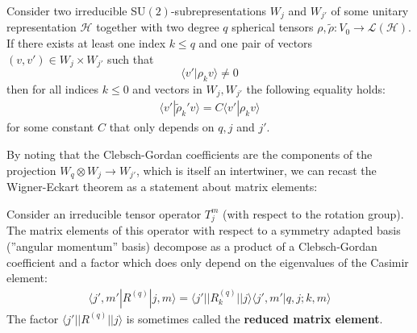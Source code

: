 	\begin{theorem}
		Consider two irreducible SU$(2)$-subrepresentations $W_j$ and $W_{j'}$ of some unitary representation $\mathcal{H}$ together with two degree $q$ spherical tensors $\rho, \tilde{\rho}:V_0\rightarrow\mathcal{L}(\mathcal{H})$. If there exists at least one index $k\leq q$ and one pair of vectors $(v, v')\in W_j\times W_{j'}$ such that \[\langle v'|\rho_k v\rangle\neq 0\] then for all indices $k\leq 0$ and vectors in $W_j, W_{j'}$ the following equality holds:
		\begin{gather}
			\langle v'|\tilde{\rho}_k' v\rangle = C\langle v'|\rho_k v\rangle
		\end{gather}
		for some constant $C$ that only depends on $q, j$ and $j'$.
	\end{theorem}
	By noting that the Clebsch-Gordan coefficients are the components of the projection $W_q\otimes W_j\rightarrow W_{j'}$, which is itself an intertwiner, we can recast the Wigner-Eckart theorem as a statement about matrix elements:
	\begin{result}
		Consider an irreducible tensor operator $T_j^m$ (with respect to the rotation group). The matrix elements of this operator with respect to a symmetry adapted basis (''angular momentum'' basis) decompose as a product of a Clebsch-Gordan coefficient and a factor which does only depend on the eigenvalues of the Casimir element:
		\begin{gather}
			\langle j', m'|R^{(q)}|j, m\rangle = \langle j'||R_k^{(q)}||j\rangle\langle j', m'|q,j;k,m\rangle
		\end{gather}
		The factor $\langle j'||R^{(q)}||j\rangle$ is sometimes called the \textbf{reduced matrix element}.
	\end{result}

